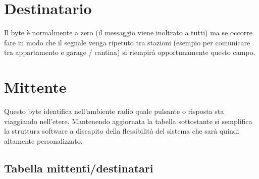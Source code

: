 \documentclass[italian]{article}
\begin{document}
    \section*{Destinatario}
    
    Il byte è normalmente a zero (il messaggio viene inoltrato a tutti) ma se occorre fare in modo che il segnale venga ripetuto tra stazioni (esempio per comunicare tra appartamento e garage / cantina) si riempirà opportunamente questo campo.
    
    \section*{Mittente}
    
    Questo byte identifica nell'ambiente radio quale pulsante o risposta sta viaggiando nell'etere. Mantenendo aggiornata la tabella sottostante si semplifica la struttura software a discapito della flessibilità del sistema che sarà quindi altamente personalizzato.
    
    \subsection{Tabella mittenti/destinatari}
    
    
\end{document}
